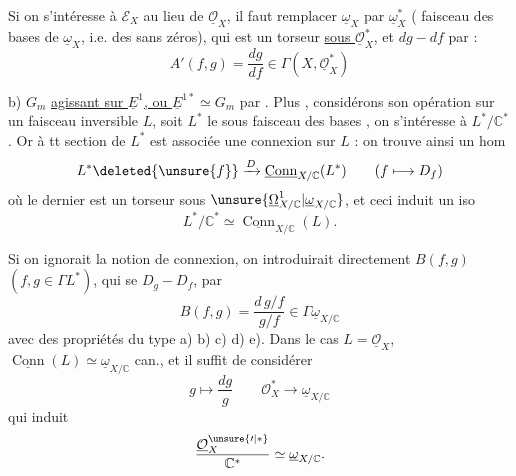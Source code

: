 Si on s'intéresse à $\mathcal E_X$ au lieu de $\underline{\mathcal O}_X$,
il faut remplacer $\underline\omega_X$ par $\underline\omega_X^*$
( faisceau des bases de $\underline\omega_X$, i.e. des
 sans zéros), qui est un torseur
\uline{sous $\underline{\mathcal O}_X^*$}, et $dg-df$ par
 :
\[
A'(f,g)=\frac{dg}{df}\in\Gamma(X,\underline{\mathcal O}_X^*)
\]

b) $G_m$ \uline{agissant sur $\underline E^1$, ou
$\underline E^{1*}\simeq G_m$} par 
. Plus , considérons
son opération sur un faisceau inversible $L$, soit $L^*$ le sous faisceau
des bases ,
on s'intéresse à $L^*/\mathbb C^*$. Or à tt section de $L^*$ est associée
une connexion sur $L$ : on trouve ainsi un hom
\[
L^*\deleted{\unsure{f}}\xrightarrow{D}
\underline{\operatorname{Conn}}_{X/\mathbb C}(L^*)
\qquad(f\longmapsto D_f)
\]
où le dernier est un torseur sous
$\unsure{\underline\Omega^1_{X/\mathbb C}|\underline\omega_{X/\mathbb C}}$,
et ceci induit un  iso
\[
L^*/\mathbb C^*\simeq\underline{\operatorname{Conn}}_{X/\mathbb C}(L).
\]

Si on ignorait la notion de connexion, on introduirait directement
$B(f,g)$ $(f,g\in\Gamma L^*)$, qui se  $D_g-D_f$, par
\[
B(f,g)=\frac{d\,g/f}{g/f}\in\Gamma\underline\omega_{X/\mathbb C}
\]
avec des propriétés du type a) b) c) d) e). Dans le cas
$L=\underline{\mathcal O}_X$,
$\underline{\operatorname{Conn}}(L)\simeq\underline\omega_{X/\mathbb C}$
can., et il suffit de considérer
\[
g\longmapsto\frac{dg}{g}\qquad
\mathcal O_X^*\longrightarrow\underline\omega_{X/\mathbb C}
\]
qui induit
\[
\frac{\underline{\mathcal O}_X^{\unsure{\prime|*}}}{\mathbb C^*}
\simeq\underline\omega_{X/\mathbb C}.
\]

